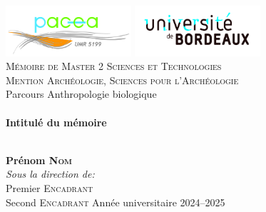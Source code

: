   \begin{center}

    \includegraphics[width=0.35\textwidth]{./images/logo_pacea}
    \hfill
    \includegraphics[width=0.35\textwidth]{./images/logo_ub}~\\[1cm]
    
    \textsc{\Large Mémoire de Master 2 Sciences et Technologies}\\[0.5cm]
    \textsc{\large Mention Archéologie, Sciences pour l'Archéologie}\\[0.5cm]
    {\large Parcours Anthropologie biologique}\\[1cm]

    \HRule \\[0.4cm]
    
    {\huge \bfseries Intitulé du mémoire\\[0.6cm]}
    
    \HRule \\[1.5cm]

    {\Large \textbf{Prénom \textsc{Nom}}}\\[1cm]
    \large
    \emph{Sous la direction de:}\\
    Premier \textsc{Encadrant}\\
    Second \textsc{Encadrant}
    \vfill
    Année universitaire 2024--2025
  \end{center}